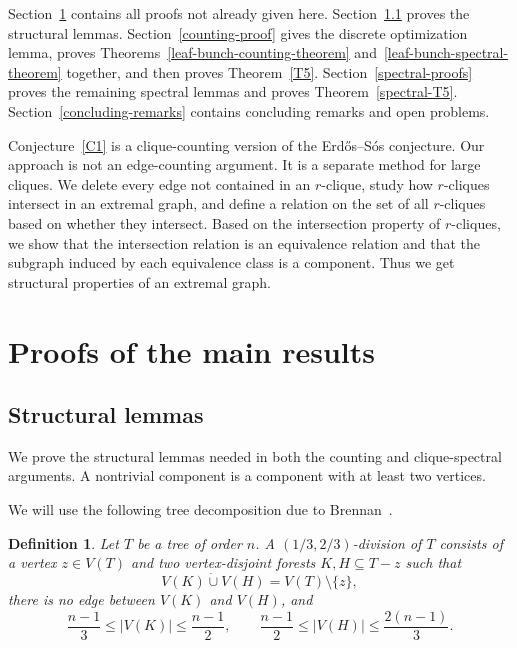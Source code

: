 \documentclass[11pt,a4paper]{article}
\newtheorem{definition}[theorem]{Definition}
\newcommand{\dunion}{\mathbin{\dot\cup}}
\begin{document}
Section~\ref{main-proof} contains all proofs not already given here. Section~\ref{preliminaries} proves the  structural lemmas. Section~\ref{counting-proof} gives the discrete optimization lemma, proves Theorems~\ref{leaf-bunch-counting-theorem} and~\ref{leaf-bunch-spectral-theorem} together, and then proves Theorem~\ref{T5}. Section~\ref{spectral-proofs} proves the remaining spectral lemmas and proves Theorem~\ref{spectral-T5}. Section~\ref{concluding-remarks} contains concluding remarks and open problems.

Conjecture~\ref{C1} is a clique-counting version of the Erd\H{o}s--S\'{o}s conjecture.
Our approach is not an edge-counting argument. It is a separate method for large cliques. We delete every edge not contained in an $r$-clique, study how $r$-cliques intersect in an extremal graph, and define a relation on the set of all $r$-cliques based on whether they intersect. Based on the intersection property of $r$-cliques, we show that the intersection relation is an equivalence relation and that the subgraph induced by each equivalence class is a component. Thus we get structural properties of an extremal graph.



\section{Proofs of the main results}\label{main-proof}

\subsection{Structural lemmas}\label{preliminaries}

We prove the structural lemmas needed in both the counting and clique-spectral arguments. A nontrivial component is a component with at least two vertices.





We will use the following tree decomposition due to Brennan~\cite{Brennan2016,Brennan2017}.

\begin{definition}\label{tree-division-definition}
Let \(T\) be a tree of order \(n\). A \emph{\((1/3,2/3)\)-division} of \(T\) consists of a vertex \(z\in V(T)\) and two vertex-disjoint forests \(K,H\subseteq T-z\) such that
\[
V(K)\dunion V(H)=V(T)\setminus\{z\},
\]
there is no edge between \(V(K)\) and \(V(H)\), and
\[
\frac{n-1}{3}\le |V(K)|\le\frac{n-1}{2},\qquad
\frac{n-1}{2}\le |V(H)|\le\frac{2(n-1)}{3}.
\]
\end{definition}
\end{document}
